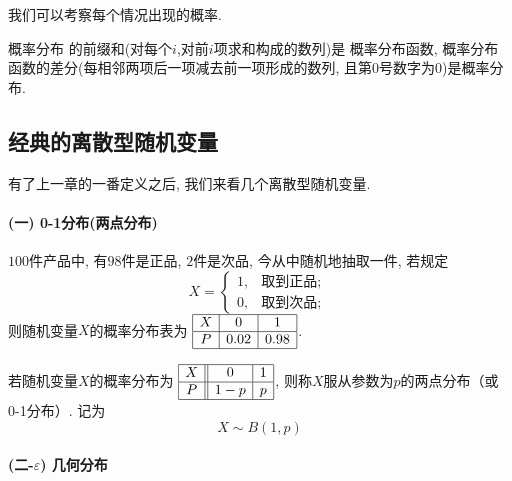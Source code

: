 \begin{takeaway}
    
    我们可以考察每个情况出现的概率. 

    概率分布 的前缀和(对每个$i$,对前$i$项求和构成的数列)是 概率分布函数, 概率分布函数的差分(每相邻两项后一项减去前一项形成的数列, 且第0号数字为0)是概率分布. 
\end{takeaway}


\subsection{经典的离散型随机变量}


有了上一章的一番定义之后, 我们来看几个离散型随机变量.

\paragraph{(一) 0-1分布(两点分布)}

\begin{example}
    $100$件产品中, 有$98$件是正品, $2$件是次品, 今从中随机地抽取一件, 若规定
    \[X=\left\{ \begin{array}{ll} 1, & \text{取到正品; } \\
             0,      & \text{取到次品; }\end{array} \right.\]
    则随机变量$X$的概率分布表为
    $\begin{array}{|c|c|c|}\hline
            X & 0    & 1    \\ \hline
            P & 0.02 & 0.98 \\ \hline
        \end{array}$. 
\end{example}

\begin{definition}[两点分布(0-1分布)]
    若随机变量$X$的概率分布为
    $\begin{array}{|c||c|c|}\hline
            X & 0   & 1 \\ \hline
            P & 1-p & p \\ \hline
        \end{array}$, 
    则称$X$服从参数为$p$的两点分布（或 0-1分布）. 记为$$X\sim B(1,p)$$
\end{definition}

\paragraph{(二-$\varepsilon$) 几何分布}

